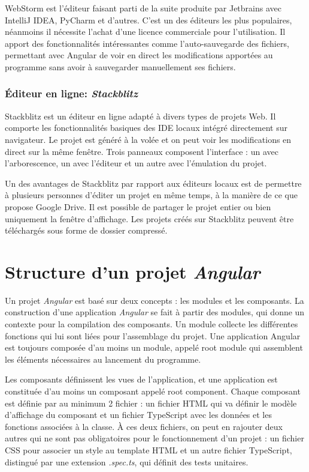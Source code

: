 \documentclass{polytech/polytech}
\begin{document}
WebStorm est l’éditeur faisant parti de la suite produite par Jetbrains avec IntelliJ IDEA, PyCharm et d’autres. C’est un des éditeurs les plus populaires, néanmoins il nécessite l’achat d’une licence commerciale pour l’utilisation. Il apport des fonctionnalités intéressantes comme l’auto-sauvegarde des fichiers, permettant avec Angular de voir en direct les modifications apportées au programme sans avoir à sauvegarder manuellement ses fichiers. 

\subsubsection{Éditeur en ligne: \textit{Stackblitz}}

Stackblitz est un éditeur en ligne adapté à divers types de projets Web. Il comporte les fonctionnalités basiques des IDE locaux intégré directement sur navigateur. Le projet est généré à la volée et on peut voir les modifications en direct sur la même fenêtre. Trois panneaux composent l’interface : un avec l’arborescence, un avec l’éditeur et un autre avec l’émulation du projet. 

Un des avantages de Stackblitz par rapport aux éditeurs locaux est de permettre à plusieurs personnes d’éditer un projet en même temps, à la manière de ce que propose Google Drive. Il est possible de partager le projet entier ou bien uniquement la fenêtre d’affichage. Les projets créés sur Stackblitz peuvent être téléchargés sous forme de dossier compressé. 

\section{Structure d'un projet \textit{Angular}}

Un projet \textit{Angular} est basé sur deux concepts : les modules et les composants. La construction d’une application \textit{Angular} se fait à partir des modules, qui donne un contexte pour la compilation des composants. Un module collecte les différentes fonctions qui lui sont liées pour l’assemblage du projet. Une application Angular est toujours composée d’au moins un module, appelé root module qui assemblent les éléments nécessaires au lancement du programme. 

Les composants définissent les vues de l’application, et une application est constituée d’au moins un composant appelé root component. Chaque composant est définie par au minimum 2 fichier : un fichier HTML qui va définir le modèle d’affichage du composant et un fichier TypeScript avec les données et les fonctions associées à la classe. À ces deux fichiers, on peut en rajouter deux autres qui ne sont pas obligatoires pour le fonctionnement d’un projet : un fichier CSS pour associer un style au template HTML et un autre fichier TypeScript, distingué par une extension \textit{.spec.ts}, qui définit des tests unitaires.
\end{document}
